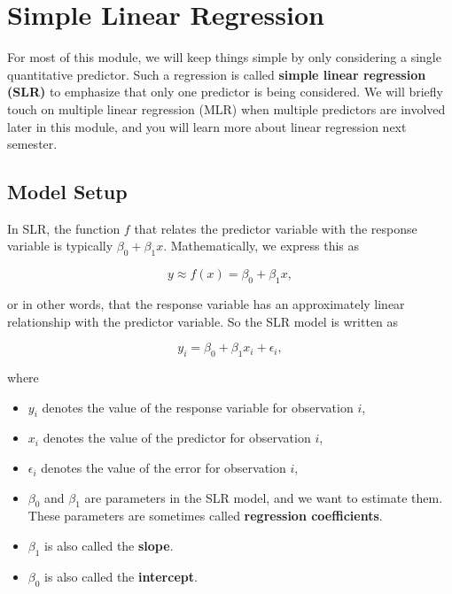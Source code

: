 \documentclass[
]{book}
\providecommand{\tightlist}{%
  \setlength{\itemsep}{0pt}\setlength{\parskip}{0pt}}
\begin{document}
\hypertarget{SLR}{%
\section{Simple Linear Regression}\label{SLR}}

For most of this module, we will keep things simple by only considering a single quantitative predictor. Such a regression is called \textbf{simple linear regression (SLR)} to emphasize that only one predictor is being considered. We will briefly touch on multiple linear regression (MLR) when multiple predictors are involved later in this module, and you will learn more about linear regression next semester.

\hypertarget{model-setup}{%
\subsection{Model Setup}\label{model-setup}}

In SLR, the function \(f\) that relates the predictor variable with the response variable is typically \(\beta_0 + \beta_1 x\). Mathematically, we express this as

\[
y \approx f(x) = \beta_0 + \beta_1 x,
\]

or in other words, that the response variable has an approximately linear relationship with the predictor variable. So the SLR model is written as

\begin{equation} 
y_i=\beta_0+\beta_{1}x_i + \epsilon_i,
\label{eq:10-SLRmod}
\end{equation}

where

\begin{itemize}
\tightlist
\item
  \(y_i\) denotes the value of the response variable for observation \(i\),
\item
  \(x_i\) denotes the value of the predictor for observation \(i\),
\item
  \(\epsilon_i\) denotes the value of the error for observation \(i\),
\item
  \(\beta_0\) and \(\beta_1\) are parameters in the SLR model, and we want to estimate them. These parameters are sometimes called \textbf{regression coefficients}.
\item
  \(\beta_1\) is also called the \textbf{slope}.
\item
  \(\beta_0\) is also called the \textbf{intercept}.
\end{itemize}
\end{document}
